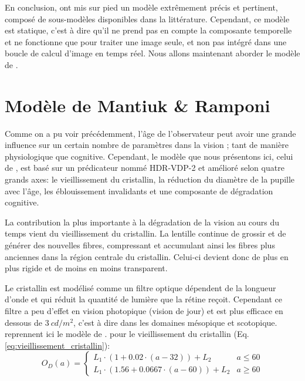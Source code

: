 	\par En conclusion, \citep{pattanaik_multiscale_1998} ont mis sur pied un modèle extrêmement précis et pertinent, composé de sous-modèles disponibles dans la littérature. Cependant, ce modèle est statique, c'est à dire qu'il ne prend pas en compte la composante temporelle et ne fonctionne que pour traiter une image seule, et non pas intégré dans une boucle de calcul d'image en temps réel. Nous allons maintenant aborder le modèle de \citep{mantiuk_human_2015}.
	
	\chapter{Modèle de Mantiuk \& Ramponi}
	\label{sec:modele_mantiuk}
	\par Comme on a pu voir précédemment, l'âge de l'observateur peut avoir une grande influence sur un certain nombre de paramètres dans la vision ; tant de manière physiologique que cognitive. Cependant, le modèle que nous présentons ici, celui de \citep{mantiuk_human_2015}, est basé sur un prédicateur nommé HDR-VDP-2 et amélioré selon quatre grands axes: le vieillissement du cristallin, la réduction du diamètre de la pupille avec l'âge, les éblouissement invalidants et une composante de dégradation cognitive. 
	
	\par La contribution la plus importante à la dégradation de la vision au cours du temps vient du vieillissement du cristallin. La lentille continue de grossir et de générer des nouvelles fibres, compressant et accumulant ainsi les fibres plus anciennes dans la région centrale du cristallin. Celui-ci devient donc de plus en plus rigide et de moins en moins transparent.
	
	\par Le cristallin est modélisé comme un filtre optique dépendent de la longueur d'onde et qui réduit la quantité de lumière que la rétine reçoit. Cependant ce filtre a peu d'effet en vision photopique (vision de jour) et est plus efficace en dessous de $3~cd/m^2$, c'est à dire dans les domaines mésopique et scotopique.
	\citep{mantiuk_human_2015} reprennent ici le modèle de \citep{pokorny_aging_1987}. pour le vieillissement du cristallin (Eq. \ref{eq:vieillissement_cristallin}):
	\begin{equation}
		O_D(a) = \begin{cases}
			 L_1 \cdot (1+0.02 \cdot (a-32))+L_2 & a \leq 60 \\ L_1 \cdot (1.56+0.0667 \cdot (a-60))+L_2 & a \geq 60 \end{cases}
		\label{eq:vieillissement_cristallin}
	\end{equation}
	
